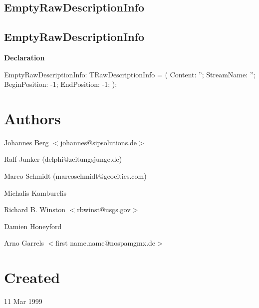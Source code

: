 \documentclass{report}
\newif\ifpdf
\begin{document}
\subsection*{\large{\textbf{EmptyRawDescriptionInfo}}\normalsize\hspace{1ex}\hrulefill}
\else
\subsection*{EmptyRawDescriptionInfo}
\fi
\label{PasDoc_Items-EmptyRawDescriptionInfo}
\begin{list}{}{
\setlength{\itemindent}{0cm}
\setlength{\listparindent}{0cm}
\setlength{\leftmargin}{\evensidemargin}
\addtolength{\leftmargin}{\tmplength}
\settowidth{\labelsep}{X}
\addtolength{\leftmargin}{\labelsep}
\setlength{\labelwidth}{\tmplength}
}
\item[\textbf{Declaration}\hfill]
\ifpdf
\begin{flushleft}
\fi
\begin{ttfamily}
EmptyRawDescriptionInfo: TRawDescriptionInfo =
  ( Content: ''; StreamName: ''; BeginPosition: -1; EndPosition: -1; );\end{ttfamily}

\ifpdf
\end{flushleft}
\fi

\end{list}
\section{Authors}
\par
Johannes Berg {$<$}johannes@sipsolutions.de{$>$}

\par
Ralf Junker (delphi@zeitungsjunge.de)

\par
Marco Schmidt (marcoschmidt@geocities.com)

\par
Michalis Kamburelis

\par
Richard B. Winston {$<$}rbwinst@usgs.gov{$>$}

\par
Damien Honeyford

\par
Arno Garrels {$<$}first name.name@nospamgmx.de{$>$}

\section{Created}
\par
11 Mar 1999
\end{document}
